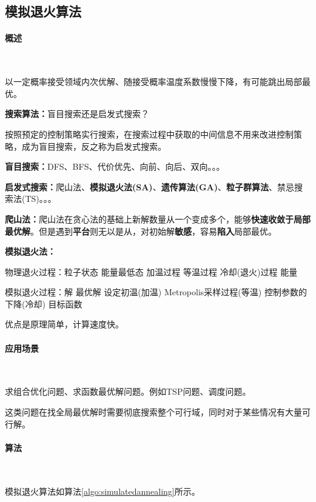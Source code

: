 \subsection{模拟退火算法}

\paragraph{概述}~{}

以一定概率接受领域内次优解、随接受概率温度系数慢慢下降，有可能跳出局部最优。

\textbf{搜索算法：}盲目搜索还是启发式搜索？

按照预定的控制策略实行搜索，在搜索过程中获取的中间信息不用来改进控制策略，成为盲目搜索，反之称为启发式搜索。

\textbf{盲目搜索：}DFS、BFS、代价优先、向前、向后、双向。。。

\textbf{启发式搜索：}爬山法、\textbf{模拟退火法(SA)}、\textbf{遗传算法(GA)}、\textbf{粒子群算法}、禁忌搜索法(TS)。。。

\textbf{爬山法：}爬山法在贪心法的基础上新解数量从一个变成多个，能够\textbf{快速收敛于局部最优解}。但是遇到\textbf{平台}则无以是从，对初始解\textbf{敏感}，容易\textbf{陷入}局部最优。

\textbf{模拟退火法：}

物理退火过程：粒子状态 \rightarrow 能量最低态 \rightarrow 加温过程 \rightarrow 等温过程 \rightarrow 冷却(退火)过程 \rightarrow 能量

模拟退火过程：解 \rightarrow 最优解 \rightarrow 设定初温(加温) \rightarrow Metropolis采样过程(等温) \rightarrow 控制参数的下降(冷却) \rightarrow 目标函数

优点是原理简单，计算速度快。

\paragraph{应用场景}~{}

求组合优化问题、求函数最优解问题。例如TSP问题、调度问题。

这类问题在找全局最优解时需要彻底搜索整个可行域，同时对于某些情况有大量可行解。

\paragraph{算法}~{}

模拟退火算法如算法\ref{algo:simulatedannealing}所示。

